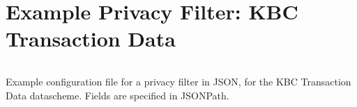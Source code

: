 \section{Example Privacy Filter: KBC Transaction Data}
\label{appendix:privacy-filter-kbc}

\begin{code}
\inputminted[linenos,tabsize=2,breaklines]{json}{code/kbcbank-filter.json}
\caption{Example configuration file for a privacy filter in JSON, for the KBC Transaction Data datascheme. Fields are specified in JSONPath.}
\label{listing:privacy-filter-kbc}
\end{code}